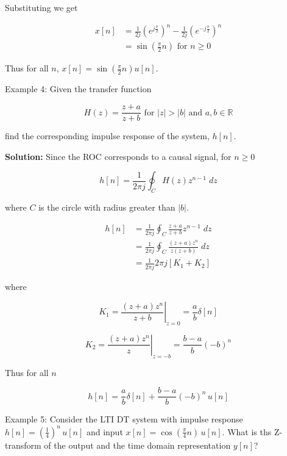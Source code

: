 \documentclass{article}
\begin{document}
Substituting we get

$$
\begin{aligned}
  x[n] &= \frac{1}{2j} \left(e^{j\frac{\pi}{2}}\right)^n -\frac{1}{2j} \left(e^{-j\frac{\pi}{2}}\right)^n\\
  &= \sin\left(\frac{\pi}{2}n \right) \text{ for } n \geq 0
\end{aligned}
$$

Thus for all $n$, $x[n] = \sin\left(\frac{\pi}{2}n \right) u[n]$.

Example 4: Given the transfer function

$$
H(z) = \frac{z+a}{z+b} \text{ for } |z| > |b| \text{ and } a,b\in\mathbb{R}
$$

find the corresponding impulse response of the system, $h[n]$.

\textbf{Solution:} Since the ROC corresponds to a causal signal, for $n \geq 0$

$$
h[n] = \frac{1}{2\pi j} \oint_C H(z) z^{n-1}\; dz
$$

where $C$ is the circle with radius greater than $|b|$.

$$
\begin{aligned}
  h[n] &= \frac{1}{2\pi j} \oint_C \frac{z+a}{z+b} z^{n-1}\; dz\\
  &= \frac{1}{2\pi j} \oint_C \frac{(z+a)z^n}{z(z+b)}\; dz\\
  &= \frac{1}{2\pi j} 2\pi j [K_1 + K_2]
\end{aligned}
$$

where

$$
K_1 = \left. \frac{(z+a)z^n}{z+b} \right|_{z=0} = \frac{a}{b}\delta[n]
$$

$$
K_2 = \left. \frac{(z+a)z^n}{z} \right|_{z=-b} = \frac{b-a}{b} \left(-b\right)^n
$$

Thus for all $n$

$$
h[n] = \frac{a}{b}\delta[n] + \frac{b-a}{b} \left(-b\right)^n\, u[n] 
$$

Example 5: Consider the LTI DT system with impulse response $h[n] = \left(\frac{1}{4}\right)^n\, u[n]$ and input $x[n] = \cos\left(\frac{\pi}{4} n\right)\, u[n]$. What is ths Z-transform of the output and the time domain representation $y[n]$?
\end{document}
